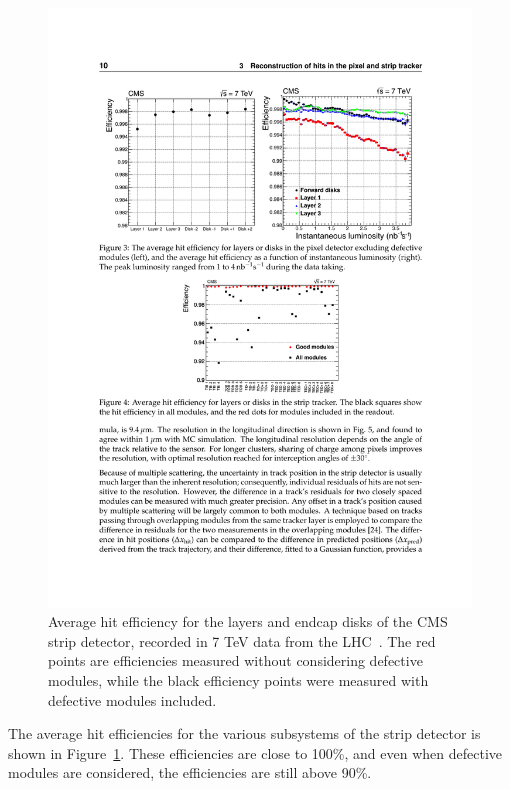 \begin{figure}[hbtp]
  \begin{center}
    \includegraphics[width=2.0\cmsFigWidth]{figures/cms-strip-performance}
    \caption{Average hit efficiency for the layers and endcap disks of the CMS strip detector, recorded in 7 TeV data from the LHC~\cite{Chatrchyan:2014fea}. The red points are efficiencies measured without considering defective modules, while the black efficiency points were measured with defective modules included.}
    \label{fig:cms-strip-performance}
  \end{center}
\end{figure}

The average hit efficiencies for the various subsystems of the strip detector is shown in Figure~\ref{fig:cms-strip-performance}. These efficiencies are close to 100\%, and even when defective modules are considered, the efficiencies are still above 90\%.


